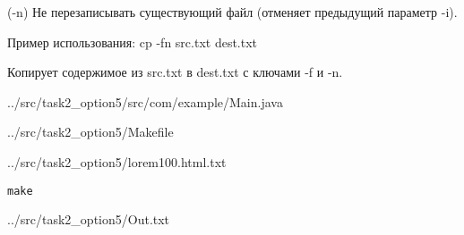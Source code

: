 (-n) Не перезаписывать существующий файл (отменяет предыдущий параметр -i).

Пример использования: cp -fn src.txt dest.txt

Копирует содержимое из src.txt в dest.txt с ключами -f и -n.


{../src/task2_option5/src/com/example/Main.java}


{../src/task2_option5/Makefile}


{../src/task2_option5/lorem100.html.txt}

\begin{lstlisting}[language=Terminal]
make
\end{lstlisting}


{../src/task2_option5/Out.txt}
